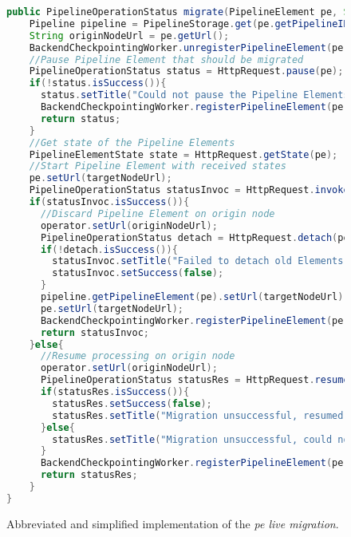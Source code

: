 \begin{figure}[H]
    \begin{lstlisting}[language=Java]
public PipelineOperationStatus migrate(PipelineElement pe, String targetNodeUrl){
    Pipeline pipeline = PipelineStorage.get(pe.getPipelineID());
    String originNodeUrl = pe.getUrl();
    BackendCheckpointingWorker.unregisterPipelineElement(pe.ID)
    //Pause Pipeline Element that should be migrated
    PipelineOperationStatus status = HttpRequest.pause(pe);
    if(!status.isSuccess()){
      status.setTitle("Could not pause the Pipeline Elements.");
      BackendCheckpointingWorker.registerPipelineElement(pe)
      return status;
    }
    //Get state of the Pipeline Elements
    PipelineElementState state = HttpRequest.getState(pe);
    //Start Pipeline Element with received states
    pe.setUrl(targetNodeUrl);
    PipelineOperationStatus statusInvoc = HttpRequest.invoke(pe, state);
    if(statusInvoc.isSuccess()){
      //Discard Pipeline Element on origin node
      operator.setUrl(originNodeUrl);
      PipelineOperationStatus detach = HttpRequest.detach(pe);
      if(!detach.isSuccess()){
        statusInvoc.setTitle("Failed to detach old Elements.");
        statusInvoc.setSuccess(false);
      }
      pipeline.getPipelineElement(pe).setUrl(targetNodeUrl);
      pe.setUrl(targetNodeUrl);
      BackendCheckpointingWorker.registerPipelineElement(pe);
      return statusInvoc;
    }else{
      //Resume processing on origin node
      operator.setUrl(originNodeUrl);
      PipelineOperationStatus statusRes = HttpRequest.resume(pe);
      if(statusRes.isSuccess()){
        statusRes.setSuccess(false);
        statusRes.setTitle("Migration unsuccessful, resumed on origin");
      }else{
        statusRes.setTitle("Migration unsuccessful, could not resume.");
      }
      BackendCheckpointingWorker.registerPipelineElement(pe);
      return statusRes;
    }
}
    \end{lstlisting}
    \caption{Abbreviated and simplified implementation of the \textit{\acrshort{pe} live migration}.}
    \label{fOSMImplementation}
\end{figure}






